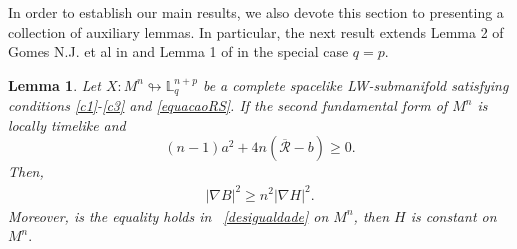\documentclass[leqno,11pt]{amsart}
\theoremstyle{plain}
\newtheorem{lemma}[theorem]{\indent\sc Lemma}
\theoremstyle{definition}
\numberwithin{equation}{section}
\begin{document}
In order to establish our main results, we also devote this section to presenting a collection of auxiliary lemmas. In particular, the next result extends Lemma 2 of Gomes N.J. et al in \cite{nazareno} and Lemma 1 of \cite{Araujo:17} in the special case $q=p$.


\begin{lemma}\label{desigualdade_BeH}
Let $X:M^n\looparrowright \mathbb{L}^{n+p}_{q}$ be a complete spacelike LW-submanifold satisfying conditions \eqref{c1}-\eqref{c3} and \eqref{equacaoRS}. If the second fundamental form of $M^n$ is locally timelike and
\begin{equation}\label{H1}
(n-1)a^2+4n(\overline{\mathcal{R}}-b)\geq 0.
\end{equation}
Then, 
\begin{eqnarray}\label{desigualdade}
|\nabla B|^2 \geq n^2|\nabla H|^2.
\end{eqnarray}
Moreover, is the equality holds in ~\eqref{desigualdade} on $M^{n}$, then $H$ is constant on $M^{n}.$
\end{lemma}
\end{document}
